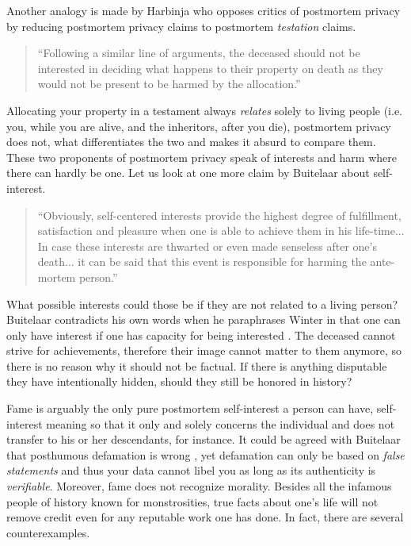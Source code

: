 Another analogy is made by Harbinja who opposes critics of postmortem privacy by reducing postmortem privacy claims to postmortem \textit{testation} claims.

\begin{quote}
    ``Following a similar line of arguments, the deceased should not be interested in deciding what happens to their property on death as they would not be present to be harmed by the allocation.'' \cite[p. 32]{harbinja2}
\end{quote}

Allocating your property in a testament always \emph{relates} solely to living people (i.e. you, while you are alive, and the inheritors, after you die), postmortem privacy does not, what differentiates the two and makes it absurd to compare them. These two proponents of postmortem privacy speak of interests and harm where there can hardly be one. Let us look at one more claim by Buitelaar about self-interest.

\begin{quote}
``Obviously, self-centered interests provide the highest degree of fulfillment, satisfaction and pleasure when one is able to achieve them in his life-time...
In case these interests are thwarted or even made senseless after one's death... it can be said that this event is responsible for harming the ante-mortem person.'' \cite[p. 133]{buitelaar}
\end{quote}

\noindent What possible interests could those be if they are not related to a living person? Buitelaar contradicts his own words when he paraphrases Winter in that one can only have interest if one has capacity for being interested \cite{buitelaar}. The deceased cannot strive for achievements, therefore their image cannot matter to them anymore, so there is no reason why it should not be factual. If there is anything disputable they have intentionally hidden, should they still be honored in history?

Fame is arguably the only pure postmortem self-interest a person can have, self-interest meaning so that it only and solely concerns the individual and does not transfer to his or her descendants, for instance. It could be agreed with Buitelaar that posthumous defamation is wrong \cite{buitelaar}, yet defamation can only be based on \emph{false statements} \cite{leroy} and thus your data cannot libel you as long as its authenticity is \emph{verifiable}. Moreover, fame does not recognize morality. Besides all the infamous people of history known for monstrosities, true facts about one's life will not remove credit even for any reputable work one has done. In fact, there are several counterexamples.

